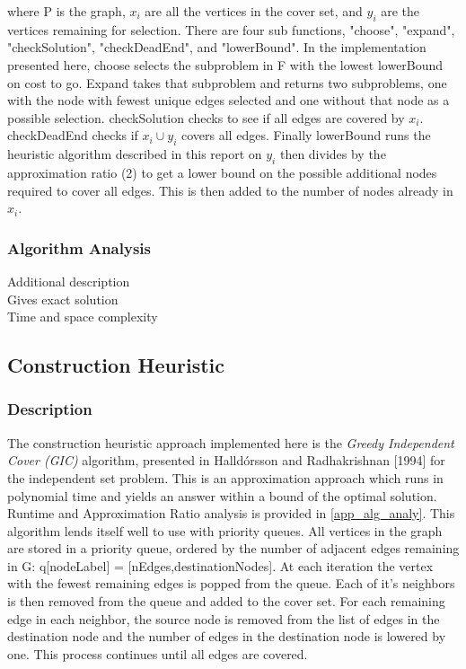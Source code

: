 \documentclass[acmlarge]{acmart}
\begin{document}
where P is the graph, $x_i$ are all the vertices in the cover set, and $y_i$ are the vertices remaining for selection. There are four sub functions, "choose", "expand", "checkSolution", "checkDeadEnd", and "lowerBound". In the implementation presented here, choose selects the subproblem in F with the lowest lowerBound on cost to go. Expand takes that subproblem and returns two subproblems, one with the node with fewest unique edges selected and one without that node as a possible selection. checkSolution checks to see if all edges are covered by $x_i$. checkDeadEnd checks if $x_i \cup y_i$ covers all edges. Finally lowerBound runs the heuristic algorithm described in this report on $y_i$ then divides by the approximation ratio (2) to get a lower bound on the possible additional nodes required to cover all edges. This is then added to the number of nodes already in $x_i$.




\subsubsection{Algorithm Analysis}

Additional description\\

Gives exact solution\\

Time and space complexity\\

\subsection{Construction Heuristic}

\subsubsection{Description}

The construction heuristic approach implemented here is the \textit{Greedy Independent Cover (GIC)} algorithm, presented in Halld\'{o}rsson and Radhakrishnan [1994] \cite{Hall97} for the independent set problem. This is an approximation approach which runs in polynomial time and yields an answer within a bound of the optimal solution. Runtime and Approximation Ratio analysis is provided in \ref{app_alg_analy}. This algorithm lends itself well to use with priority queues. All vertices in the graph are stored in a priority queue, ordered by the number of adjacent edges remaining in G: q[nodeLabel] = [nEdges,destinationNodes]. At each iteration the vertex with the fewest remaining edges is popped from the queue. Each of it's neighbors is then removed from the queue and added to the cover set. For each remaining edge in each neighbor, the source node is removed from the list of edges in the destination node and the number of edges in the destination node is lowered by one. This process continues until all edges are covered.
\end{document}
